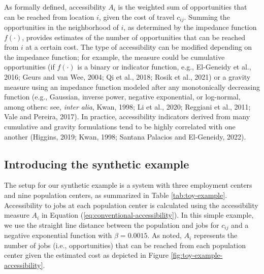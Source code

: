 \documentclass[]{elsarticle} %
\begin{document}
As formally defined, accessibility \(A_i\) is the weighted sum of
opportunities that can be reached from location \(i\), given the cost of
travel \(c_{ij}\). Summing the opportunities in the neighborhood of
\(i\), as determined by the impedance function \(f(\cdot)\), provides
estimates of the number of opportunities that can be reached from \(i\)
at a certain cost. The type of accessibility can be modified depending
on the impedance function; for example, the measure could be cumulative
opportunities (if \(f(\cdot)\) is a binary or indicator function, e.g.,
El-Geneidy et al., 2016; Geurs and van Wee, 2004; Qi et al., 2018; Rosik
et al., 2021) or a gravity measure using an impedance function modeled
after any monotonically decreasing function (e.g., Gaussian, inverse
power, negative exponential, or log-normal, among others: see,
\emph{inter alia}, Kwan, 1998; Li et al., 2020; Reggiani et al., 2011;
Vale and Pereira, 2017). In practice, accessibility indicators derived
from many cumulative and gravity formulations tend to be highly
correlated with one another (Higgins, 2019; Kwan, 1998; Santana Palacios
and El-Geneidy, 2022).

\hypertarget{accessibility-numerical-example}{%
\subsection{Introducing the synthetic
example}\label{accessibility-numerical-example}}

The setup for our synthetic example is a system with three employment
centers and nine population centers, as summarized in Table
\ref{tab:toy-example}. Accessibility to jobs at each population center
is calculated using the accessibility measure \(A_i\) in Equation
(\ref{eq:conventional-accessibility}). In this simple example, we use
the straight line distance between the population and jobs for
\(c_{ij}\) and a negative exponential function with \(\beta = 0.0015\).
As noted, \(A_i\) represents the number of jobs (i.e., opportunities)
that can be reached from each population center given the estimated cost
as depicted in Figure \ref{fig:toy-example-accessibility}.
\end{document}
